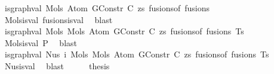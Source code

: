 \begin{isabellebody}
\ {\isachardoublequoteopen}is{\isacharunderscore}{\kern0pt}graph{\isacharunderscore}{\kern0pt}val\ {\isacharparenleft}{\kern0pt}Mols{}\ {\isacharparenleft}{\kern0pt}Atom\ {\isacharparenleft}{\kern0pt}GConstr\ C{\isacharparenright}{\kern0pt}\ zs{\isacharparenright}{\kern0pt}\ {\isacharparenleft}{\kern0pt}fusions{\isacharunderscore}{\kern0pt}of\ fusions{\isacharparenright}{\kern0pt}{\isacharparenright}{\kern0pt}{\isachardoublequoteclose}\isanewline
\ \ \ \ \isamarkupfalse%
\ Mols{}{\isacharunderscore}{\kern0pt}is{\isacharunderscore}{\kern0pt}val\ fusions{\isacharunderscore}{\kern0pt}is{\isacharunderscore}{\kern0pt}val\ \isamarkupfalse%
\ blast\isanewline
\isanewline
\ \ \isamarkupfalse%
\ \isamarkupfalse%
\ {\isachardoublequoteopen}is{\isacharunderscore}{\kern0pt}graph{\isacharunderscore}{\kern0pt}val\ {\isacharparenleft}{\kern0pt}Mols{}\ {\isacharparenleft}{\kern0pt}Mols{}\ {\isacharparenleft}{\kern0pt}Atom\ {\isacharparenleft}{\kern0pt}GConstr\ C{\isacharparenright}{\kern0pt}\ zs{\isacharparenright}{\kern0pt}\ {\isacharparenleft}{\kern0pt}fusions{\isacharunderscore}{\kern0pt}of\ fusions{\isacharparenright}{\kern0pt}{\isacharparenright}{\kern0pt}\ Ts{\isacharparenright}{\kern0pt}{\isachardoublequoteclose}\isanewline
\ \ \ \ \isamarkupfalse%
\ Mols{}{\isacharunderscore}{\kern0pt}is{\isacharunderscore}{\kern0pt}val\ P{}\ \isamarkupfalse%
\ blast\isanewline
\isanewline
\ \ \isamarkupfalse%
\ \isamarkupfalse%
\ {\isachardoublequoteopen}is{\isacharunderscore}{\kern0pt}graph{\isacharunderscore}{\kern0pt}val\ {\isacharparenleft}{\kern0pt}Nus{}\ i\ {\isacharparenleft}{\kern0pt}Mols{}\ {\isacharparenleft}{\kern0pt}Mols{}\ {\isacharparenleft}{\kern0pt}Atom\ {\isacharparenleft}{\kern0pt}GConstr\ C{\isacharparenright}{\kern0pt}\ zs{\isacharparenright}{\kern0pt}\ {\isacharparenleft}{\kern0pt}fusions{\isacharunderscore}{\kern0pt}of\ fusions{\isacharparenright}{\kern0pt}{\isacharparenright}{\kern0pt}\ Ts{\isacharparenright}{\kern0pt}{\isacharparenright}{\kern0pt}{\isachardoublequoteclose}\isanewline
\ \ \ \ \isamarkupfalse%
\ Nus{\isacharunderscore}{\kern0pt}is{\isacharunderscore}{\kern0pt}val\ \isamarkupfalse%
\ blast\isanewline
\isanewline
\ \ \isamarkupfalse%
\ \isamarkupfalse%
\ {\isacharquery}{\kern0pt}thesis\isanewline
\ \ \ \ \isamarkupfalse%

\end{isabellebody}
